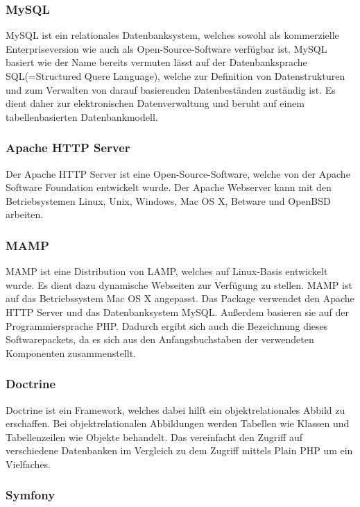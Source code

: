     \subsubsection{MySQL}

	MySQL ist ein relationales Datenbanksystem, welches sowohl als kommerzielle Enterpriseversion wie auch als Open-Source-Software verfügbar ist. MySQL basiert wie der Name bereits vermuten lässt auf der Datenbanksprache SQL(=Structured Quere Language), welche zur Definition von Datenstrukturen und zum Verwalten von darauf basierenden Datenbeständen zuständig ist. Es dient daher zur elektronischen Datenverwaltung und beruht auf einem tabellenbasierten Datenbankmodell.

    \subsubsection{Apache HTTP Server}

	Der Apache HTTP Server ist eine Open-Source-Software, welche von der Apache Software Foundation entwickelt wurde. Der Apache Webserver kann mit den Betriebsystemen Linux, Unix, Windows, Mac OS X, Betware und OpenBSD arbeiten.

    \subsubsection{MAMP}

	MAMP ist eine Distribution von LAMP, welches auf Linux-Basis entwickelt wurde. Es dient dazu dynamische Webseiten zur Verfügung zu stellen. MAMP ist auf das Betriebssystem Mac OS X angepasst. Das Package verwendet den Apache HTTP Server und das Datenbanksystem MySQL. Außerdem basieren sie auf der Programmiersprache PHP. Dadurch ergibt sich auch die Bezeichnung dieses Softwarepackets, da es sich aus den Anfangsbuchstaben der verwendeten Komponenten zusammenstellt.

    \subsubsection{Doctrine}

	Doctrine ist ein Framework, welches dabei hilft ein objektrelationales Abbild zu erschaffen. Bei objektrelationalen Abbildungen werden Tabellen wie Klassen und Tabellenzeilen wie Objekte behandelt. Das vereinfacht den Zugriff auf verschiedene Datenbanken im Vergleich zu dem Zugriff mittels Plain PHP um ein Vielfaches.

    \subsubsection{Symfony}

